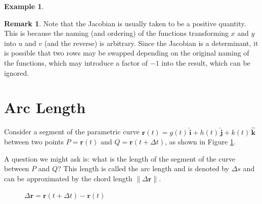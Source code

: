 \documentclass{article}
\theoremstyle{definition}
\newtheorem{example}{Example}[section]
\newtheorem{remark}{Remark}[section]
\begin{document}
\begin{example}

\bigskip
\begin{remark}
Note that the Jacobian is usually taken to be a positive
quantity.  This is because the naming (and ordering) of the
functions transforming $x$ and $y$ into $u$ and $v$ (and the
reverse) is arbitrary. Since the Jacobian is a determinant, it is
possible that two rows may be swapped depending on the original
naming of the functions, which may introduce a factor of $-1$
into the result, which can be ignored.
\label{remark:minus_jacobian}
\end{remark}
\end{example}

\section{Arc Length}
\label{sec:arc_length}
Consider a segment of the parametric curve $\mathbf{r}(t) = g(t) \,
\hat{\mathbf{i}} + h(t) \, \hat{\mathbf{j}} + k(t) \,
\hat{\mathbf{k}}$ between two points $P =\mathbf{r}(t)$ and $Q
=\mathbf{r}(t + \Delta t)$, as shown in Figure \ref{fig:delta-r}.

\bigskip
\noindent
A question we might ask is: what is the length of the segment 
of the curve between $P$ and $Q$? This length is called the arc
length and is denoted by $\Delta s$ and can be approximated
by the chord length $\| \Delta \mathbf{r} \|$. 



\bigskip
\begin{figure}[H]
\caption{$\Delta \mathbf{r} = \mathbf{r}(t + \Delta t) - \mathbf{r}(t)$}
\label{fig:delta-r}
\end{figure}
\end{document}
